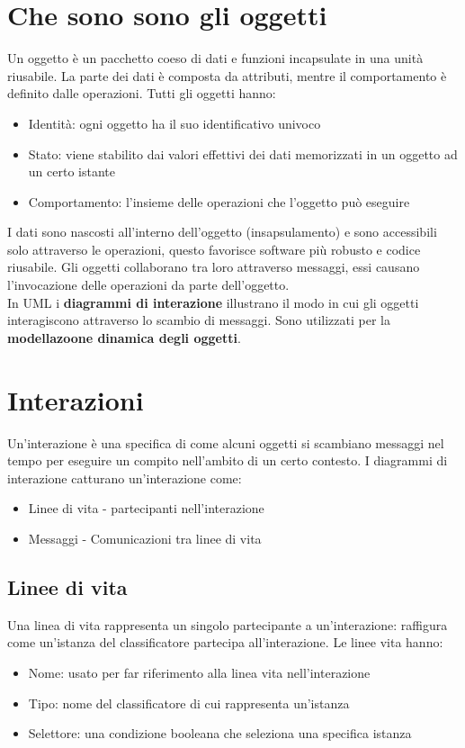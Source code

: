 \section{Che sono sono gli oggetti}
Un oggetto è un pacchetto coeso di dati e funzioni incapsulate in una unità
riusabile. La parte dei dati è composta da attributi, mentre il comportamento
è definito dalle operazioni.
Tutti gli oggetti hanno:
\begin{itemize}
    \item Identità: ogni oggetto ha il suo identificativo univoco
    \item Stato: viene stabilito dai valori effettivi dei dati memorizzati in un oggetto
    ad un certo istante
    \item Comportamento: l'insieme delle operazioni che l'oggetto può eseguire
\end{itemize}
I dati sono nascosti all'interno dell'oggetto (insapsulamento) e sono accessibili
solo attraverso le operazioni, questo favorisce software più robusto e codice riusabile.
Gli oggetti collaborano tra loro attraverso messaggi, essi causano l'invocazione
delle operazioni da parte dell'oggetto.
\\ In UML i \textbf{diagrammi di interazione} illustrano il modo in cui gli oggetti
interagiscono attraverso lo scambio di messaggi. Sono utilizzati per la
\textbf{modellazoone dinamica degli oggetti}.
\section{Interazioni}
Un'interazione è una specifica di come alcuni oggetti si scambiano messaggi nel tempo
 per eseguire un compito nell'ambito di un certo contesto.
I diagrammi di interazione catturano un'interazione come:
\begin{itemize}
    \item Linee di vita - partecipanti nell'interazione
    \item Messaggi - Comunicazioni tra linee di vita
\end{itemize}
\subsection{Linee di vita}
Una linea di vita rappresenta un singolo partecipante a un'interazione:
raffigura come un'istanza del classificatore partecipa all'interazione.
Le linee vita hanno:
\begin{itemize}
    \item Nome: usato per far riferimento alla linea vita nell'interazione
    \item Tipo: nome del classificatore di cui rappresenta un'istanza
    \item Selettore: una condizione booleana che seleziona una specifica istanza
\end{itemize}

